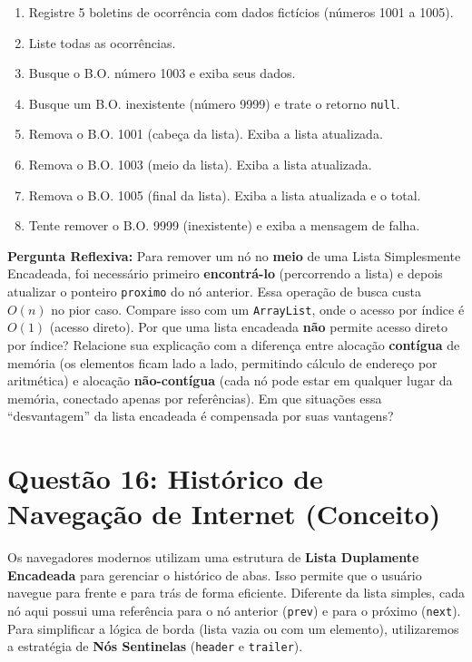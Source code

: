 \documentclass[12pt, a4paper]{article}
\begin{document}
\begin{itemize}
    \begin{enumerate}
        \item Registre 5 boletins de ocorrência com dados fictícios (números 1001 a 1005).
        \item Liste todas as ocorrências.
        \item Busque o B.O. número 1003 e exiba seus dados.
        \item Busque um B.O. inexistente (número 9999) e trate o retorno \texttt{null}.
        \item Remova o B.O. 1001 (cabeça da lista). Exiba a lista atualizada.
        \item Remova o B.O. 1003 (meio da lista). Exiba a lista atualizada.
        \item Remova o B.O. 1005 (final da lista). Exiba a lista atualizada e o total.
        \item Tente remover o B.O. 9999 (inexistente) e exiba a mensagem de falha.
    \end{enumerate}
\end{itemize}

\textbf{Pergunta Reflexiva:} Para remover um nó no \textbf{meio} de uma Lista Simplesmente Encadeada, foi necessário primeiro \textbf{encontrá-lo} (percorrendo a lista) e depois atualizar o ponteiro \texttt{proximo} do nó anterior. Essa operação de busca custa $O(n)$ no pior caso. Compare isso com um \texttt{ArrayList}, onde o acesso por índice é $O(1)$ (acesso direto). Por que uma lista encadeada \textbf{não} permite acesso direto por índice? Relacione sua explicação com a diferença entre alocação \textbf{contígua} de memória (os elementos ficam lado a lado, permitindo cálculo de endereço por aritmética) e alocação \textbf{não-contígua} (cada nó pode estar em qualquer lugar da memória, conectado apenas por referências). Em que situações essa ``desvantagem'' da lista encadeada é compensada por suas vantagens?


\section*{Questão 16: Histórico de Navegação de Internet (Conceito)}
Os navegadores modernos utilizam uma estrutura de \textbf{Lista Duplamente Encadeada} para gerenciar o histórico de abas. Isso permite que o usuário navegue para frente e para trás de forma eficiente. Diferente da lista simples, cada nó aqui possui uma referência para o nó anterior (\texttt{prev}) e para o próximo (\texttt{next}). Para simplificar a lógica de borda (lista vazia ou com um elemento), utilizaremos a estratégia de \textbf{Nós Sentinelas} (\texttt{header} e \texttt{trailer}).
\end{document}
